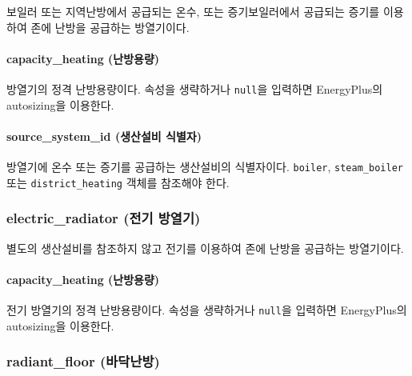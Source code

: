 보일러 또는 지역난방에서 공급되는 온수, 또는 증기보일러에서 공급되는 증기를 이용하여 존에 난방을 공급하는 방열기이다.


\paragraph{capacity\_heating (난방용량)} 방열기의 정격 난방용량이다. 속성을 생략하거나 \texttt{null}을 입력하면 EnergyPlus의 autosizing을 이용한다.

\paragraph{source\_system\_id (생산설비 식별자)} 방열기에 온수 또는 증기를 공급하는 생산설비의 식별자이다. \texttt{boiler}, \texttt{steam\_\allowbreak boiler} 또는 \texttt{district\_\allowbreak heating} 객체를 참조해야 한다.

\subsubsection{electric\_radiator (전기 방열기)} \label{subsubsection:ioref:electricradiator}

별도의 생산설비를 참조하지 않고 전기를 이용하여 존에 난방을 공급하는 방열기이다.


\paragraph{capacity\_heating (난방용량)} 전기 방열기의 정격 난방용량이다. 속성을 생략하거나 \texttt{null}을 입력하면 EnergyPlus의 autosizing을 이용한다.

\subsubsection{radiant\_floor (바닥난방)} \label{subsubsection:ioref:radiantfloor}

